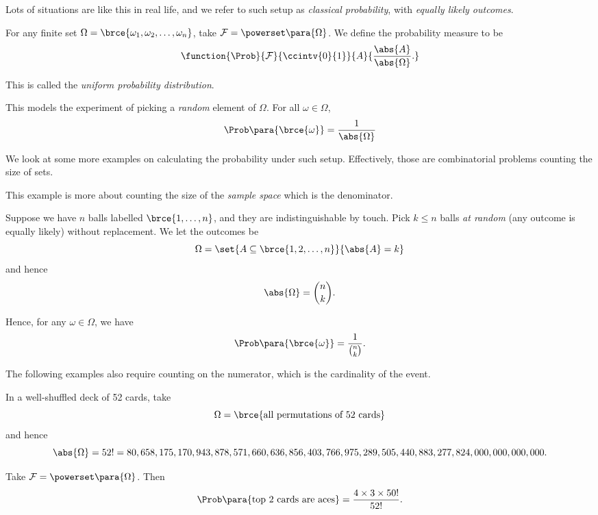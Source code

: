 Lots of situations are like this in real life, and we refer to such setup as \emph{classical probability}, with \emph{equally likely outcomes}.

\begin{definition}
    \label{def:equally-likely-outcomes}%
    For any finite set \(\Omega = \brce{\omega_1, \omega_2, \ldots, \omega_n}\), take \(\mathcal{F} = \powerset\para{\Omega}\). We define the probability measure to be
    \[
        \function{\Prob}{\mathcal{F}}{\ccintv{0}{1}}{A}{\frac{\abs{A}}{\abs{\Omega}}.}
    \]

    This is called the \emph{uniform probability distribution}.
\end{definition}

This models the experiment of picking a \emph{random} element of \(\Omega\). For all \(\omega \in \Omega\),
\[
    \Prob\para{\brce{\omega}} = \frac{1}{\abs{\Omega}}
\]

We look at some more examples on calculating the probability under such setup. Effectively, those are combinatorial problems counting the size of sets.

This example is more about counting the size of the \emph{sample space} which is the denominator.

\begin{example}
    \label{ex:picking-balls-from-bag}%
    Suppose we have \(n\) balls labelled \(\brce{1, \ldots, n}\), and they are indistinguishable by touch. Pick \(k \leq n\) balls \emph{at random} (any outcome is equally likely) without replacement. We let the outcomes be
    \[
        \Omega = \set{A \subseteq \brce{1, 2, \ldots, n}}{\abs{A} = k}
    \]
    and hence
    \[
        \abs{\Omega} = \binom{n}{k}.
    \]

    Hence, for any \(\omega \in \Omega\), we have
    \[
        \Prob\para{\brce{\omega}} = \frac{1}{\binom{n}{k}}.
    \]
\end{example}

The following examples also require counting on the numerator, which is the cardinality of the event.

\begin{example}
    \label{ex:deck-of-cards}%
    In a well-shuffled deck of 52 cards, take
    \[
        \Omega = \brce{\text{all permutations of 52 cards}}
    \]
    and hence
    \[
        \abs{\Omega} = 52! = 80,658,175,170,943,878,571,660,636,856,403,766,975,289,505,440,883,277,824,000,000,000,000.
    \]
    
    Take \(\mathcal{F} = \powerset\para{\Omega}\). Then
    \[
        \Prob\para{\text{top 2 cards are aces}} = \frac{4 \times 3 \times 50!}{52!}.
    \]
\end{example}

